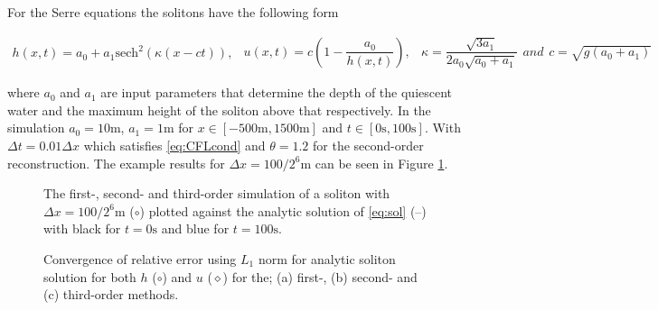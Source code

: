 \documentclass[SingleSpace,12pt,Proceedings]{Serre_ASCE}
\begin{document}
For the Serre equations the solitons have the following form
\begin{linenomath}
\begin{subequations}
\begin{gather}
h\left(x,t\right) = a_0 + a_1\text{sech}^2\left( \kappa\left(x - ct\right)\right),
\end{gather}
\begin{gather}
u\left(x,t\right) = c\left(1 - \dfrac{a_0}{h(x,t)} \right),
\end{gather}
\begin{gather}
\kappa = \dfrac{\sqrt{3a_1}}{2a_0 \sqrt{ a_0 + a_1}}
\end{gather}
and
\begin{gather}
c = \sqrt{g \left(a_0 + a_1\right)}
\end{gather}
\label{eq:sol}
\end{subequations}
\end{linenomath}
where $a_0$ and $a_1$ are input parameters that determine the depth of the quiescent water and the maximum height of the soliton above that respectively. In the simulation $a_0 = 10\text{m}$, $a_1 = 1\text{m}$ for $x\in\left[-500\text{m},1500\text{m}\right]$ and $t\in\left[0\text{s},100\text{s}\right]$. With $\Delta t = 0.01 \Delta x$ which satisfies \eqref{eq:CFLcond} and $\theta = 1.2$ for the second-order reconstruction. The example results for $\Delta x = 100 /2^{6}\text{m}$ can be seen in Figure \ref{fig:solitone}.

\subfiglabelskip=0pt
\begin{figure}
\centering
{}
\caption{The first-, second- and third-order simulation of a soliton with $\Delta x = 100 /2^{6}\text{m}$ ($\circ$) plotted against the analytic solution of \eqref{eq:sol} (\---) with black for $t =0\text{s}$ and blue for $t=100\text{s}$.}
\label{fig:solitone}
\end{figure}
\begin{figure}
\centering
{}
\caption{Convergence of relative error using $L_1$ norm for analytic soliton solution for both $h$ ($\circ$) and $u$ ($\diamond$) for the; (a) first-, (b) second- and (c) third-order methods.}
\label{fig:solitoncon}
\end{figure} 
\end{document}
